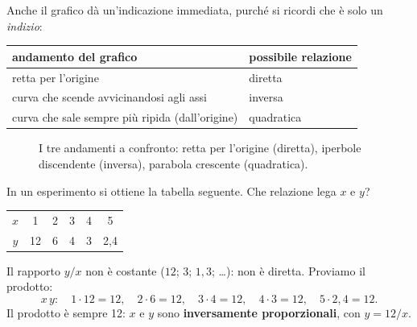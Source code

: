 Anche il grafico dà un'indicazione immediata, purché si ricordi che è solo un \emph{indizio}:
\begin{center}
\begin{tabular}{ll}
\toprule
andamento del grafico & possibile relazione \\
\midrule
retta per l'origine & diretta \\
curva che scende avvicinandosi agli assi & inversa \\
curva che sale sempre più ripida (dall'origine) & quadratica \\
\bottomrule
\end{tabular}
\end{center}

\begin{figure}[!htbp]
    \centering
    \caption{I tre andamenti a confronto: retta per l'origine (diretta), iperbole discendente (inversa), parabola crescente (quadratica).}
    \label{fig:tre-andamenti}
\end{figure}

\begin{testexample}
In un esperimento si ottiene la tabella seguente. Che relazione lega $x$ e $y$?
\begin{center}
\begin{tabular}{c|ccccc}
\toprule
$x$ & 1 & 2 & 3 & 4 & 5 \\
$y$ & 12 & 6 & 4 & 3 & 2{,}4 \\
\bottomrule
\end{tabular}
\end{center}
Il rapporto $y/x$ non è costante ($12$; $3$; $1{,}3$; \dots): non è diretta. Proviamo il prodotto:
\[ x\,y: \quad 1\cdot 12 = 12, \quad 2\cdot 6 = 12, \quad 3\cdot 4 = 12, \quad 4\cdot 3 = 12, \quad 5\cdot 2{,}4 = 12. \]
Il prodotto è sempre \SI{12}{}: $x$ e $y$ sono \textbf{inversamente proporzionali}, con $y = 12/x$.
\end{testexample}

